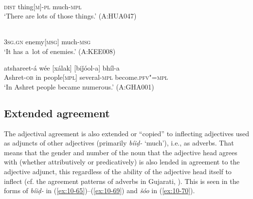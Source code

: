 \begin{exe}
\ex
\label{ex:10-62}
 \\
\textsc{dist} thing[\textsc{m}]-\textsc{pl} much-\textsc{mpl} \\
\glt `There are lots of those things.' (A:HUA047)

\ex
\label{ex:10-63}
 \\
\textsc{3sg.gn} enemy[\textsc{msg}] much-\textsc{msg} \\
\glt `It has a~lot of enemies.' (A:KEE008)

\ex
\label{ex:10-64}
\gll atshareet-á wée [xálak] [biǰóol-a] bhíl-a \\
Ashret-\textsc{ob} in people[\textsc{mpl}] several-\textsc{mpl} become.\textsc{pfv"=mpl} \\
\glt `In Ashret people became numerous.' (A:GHA001)
\end{exe}

\subsection{Extended agreement}
\label{subsec:10-3-4}


The adjectival agreement is also extended or ``copied'' to inflecting adjectives used as adjuncts of other adjectives (primarily \textit{bíiḍ-} `much'), i.e., as adverbs. That means that the gender and number of the noun that the adjective head agrees with (whether attributively or predicatively) is also lended in agreement to the adjective adjunct, this regardless of the ability of the adjective head itself to inflect (cf. the agreement patterns of adverbs in Gujarati, \citealt{hookjoshi1991}). This is seen in the forms of \textit{bíiḍ-} in (\ref{ex:10-65})--(\ref{ex:10-69}) and \textit{šóo} in (\ref{ex:10-70}).

